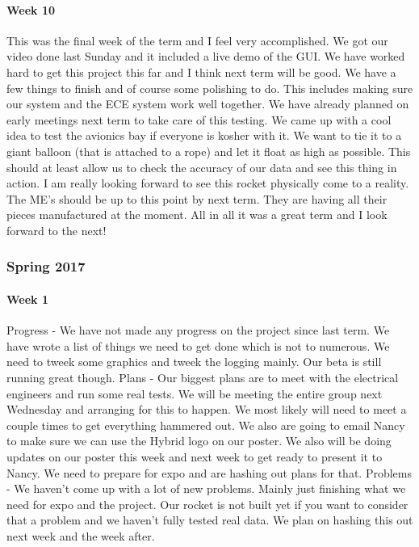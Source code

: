 \documentclass[10pt,draftclsnofoot,onecolumn,retainorgcmds]{IEEEtran}
\begin{document}
\paragraph{Week 10}
This was the final week of the term and I feel very accomplished. We got our video done last Sunday and it included a live demo of the GUI. We have worked hard to get this project this far and I think next term will be good. We have a few things to finish and of course some polishing to do. This includes making sure our system and the ECE system work well together. We have already planned on early meetings next term to take care of this testing. We came up with a cool idea to test the avionics bay if everyone is kosher with it. We want to tie it to a giant balloon (that is attached to a rope) and let it float as high as possible. This should at least allow us to check the accuracy of our data and see this thing in action. I am really looking forward to see this rocket physically come to a reality. The ME's should be up to this point by next term. They are having all their pieces manufactured at the moment. All in all it was a great term and I look forward to the next! \\
\subsubsection{Spring 2017}
\paragraph{Week 1}
Progress - We have not made any progress on the project since last term. We have wrote a list of things we need to get done which is not to numerous. We need to tweek some graphics and tweek the logging mainly. Our beta is still running great though. Plans - Our biggest plans are to meet with the electrical engineers and run some real tests. We will be meeting the entire group next Wednesday and arranging for this to happen. We most likely will need to meet a couple times to get everything hammered out. We also are going to email Nancy to make sure we can use the Hybrid logo on our poster. We also will be doing updates on our poster this week and next week to get ready to present it to Nancy. We need to prepare for expo and are hashing out plans for that. Problems - We haven't come up with a lot of new problems. Mainly just finishing what we need for expo and the project. Our rocket is not built yet if you want to consider that a problem and we haven't fully tested real data. We plan on hashing this out next week and the week after. \\
\end{document}
